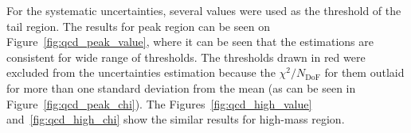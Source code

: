 \begin{figure}
\end{figure}

For the systematic uncertainties, several values were used as the threshold of the tail region. The results for peak region can be seen on Figure~\ref{fig:qcd_peak_value}, where it can be seen that the estimations are consistent for wide range of thresholds. The thresholds drawn in red were excluded from the uncertainties estimation because the $\chi^2/N_\mathrm{DoF}$ for them outlaid for more than one standard deviation from the mean (as can be seen in Figure~\ref{fig:qcd_peak_chi}). The Figures~\ref{fig:qcd_high_value} and~\ref{fig:qcd_high_chi} show the similar results for high-mass region.

